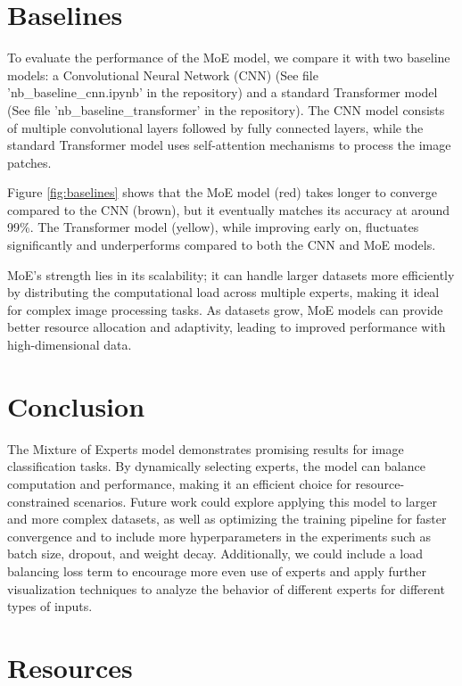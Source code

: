 \documentclass[a4paper,11pt]{article}
\begin{document}
\section{Baselines}
To evaluate the performance of the MoE model, we compare it with two baseline models: a Convolutional Neural Network (CNN) (See file 'nb\_baseline\_cnn.ipynb' in the repository) and a standard Transformer model (See file 'nb\_baseline\_transformer' in the repository). The CNN model consists of multiple convolutional layers followed by fully connected layers, while the standard Transformer model uses self-attention mechanisms to process the image patches.

Figure \ref{fig:baselines} shows that the MoE model (red) takes longer to converge compared to the CNN (brown), but it eventually matches its accuracy at around 99\%. The Transformer model (yellow), while improving early on, fluctuates significantly and underperforms compared to both the CNN and MoE models. 

MoE's strength lies in its scalability; it can handle larger datasets more efficiently by distributing the computational load across multiple experts, making it ideal for complex image processing tasks. As datasets grow, MoE models can provide better resource allocation and adaptivity, leading to improved performance with high-dimensional data.

\section{Conclusion}
The Mixture of Experts model demonstrates promising results for image classification tasks. By dynamically selecting experts, the model can balance computation and performance, making it an efficient choice for resource-constrained scenarios. Future work could explore applying this model to larger and more complex datasets, as well as optimizing the training pipeline for faster convergence and to include more hyperparameters in the experiments such as batch size, dropout, and weight decay. Additionally, we could include a load balancing loss term to encourage more even use of experts and apply further visualization techniques to analyze the behavior of different experts for different types of inputs.



\section{Resources}
\end{document}

